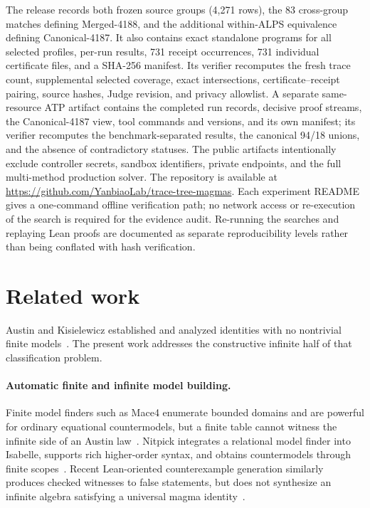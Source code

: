 \documentclass[runningheads]{llncs}
\begin{document}
The release records both frozen source groups (4,271 rows), the 83 cross-group
matches defining Merged-4188, and the additional within-ALPS equivalence
defining Canonical-4187.  It also contains exact standalone programs for all
selected profiles, per-run results,
731 receipt occurrences, 731 individual certificate files, and a SHA-256
manifest.  Its verifier recomputes the fresh trace count, supplemental selected
coverage, exact intersections, certificate--receipt pairing, source hashes,
Judge revision, and privacy allowlist.  A separate same-resource ATP artifact
contains the completed run records, decisive proof streams, the
Canonical-4187 view, tool commands and versions, and its own manifest; its verifier recomputes
the benchmark-separated results, the canonical 94/18 unions, and the absence
of contradictory statuses.  The public
artifacts intentionally exclude controller secrets, sandbox identifiers,
private endpoints, and the full multi-method production solver.  The
repository is available at
\url{https://github.com/YanbiaoLab/trace-tree-magmas}.
Each experiment README gives a one-command offline verification path; no
network access or re-execution of the search is required for the evidence
audit.  Re-running the searches and replaying Lean proofs are documented as
separate reproducibility levels rather than being conflated with hash
verification.

\section{Related work}

Austin and Kisielewicz established and analyzed identities with no nontrivial
finite models~\cite{Austin1965,Austin1966,Kisielewicz1990,Kisielewicz1997}.
The present work addresses the constructive infinite half of that
classification problem.

\paragraph{Automatic finite and infinite model building.}
Finite model finders such as Mace4 enumerate bounded domains and are powerful
for ordinary equational countermodels, but a finite table cannot witness the
infinite side of an Austin law~\cite{McCune2003}.  Nitpick integrates a
relational model finder into Isabelle, supports rich higher-order syntax, and
obtains countermodels through finite scopes~\cite{BlanchetteNipkow2010}.
Recent Lean-oriented counterexample generation similarly produces checked
witnesses to false statements, but does not synthesize an infinite algebra
satisfying a universal magma identity~\cite{LiEtAl2026}.
\end{document}
